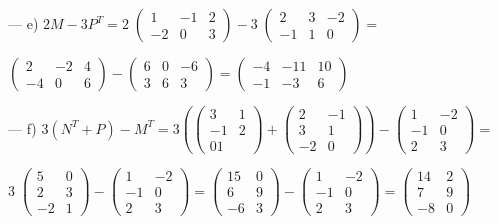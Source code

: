 \begin{proofw}
\noindent --- e) $2M-3P^T=2\; \left( \begin{matrix} 1&-1&2\\-2&0&3  \end{matrix} \right) - 3\; \left( \begin{matrix} 2&3&-2\\-1&1&0  \end{matrix} \right)=$

\noindent $\left( \begin{matrix} 2&-2&4\\-4&0&6   \end{matrix} \right) - \left( \begin{matrix} 6&0&-6\\3&6&3   \end{matrix} \right) = 
\left( \begin{matrix}  -4&-11&10\\-1&-3&6  \end{matrix} \right)$

\noindent --- f) $3(N^T+P)-M^T=3\left( 
\left( \begin{matrix}  3&1\\-1&2\\01  \end{matrix} \right)+
\left( \begin{matrix}  2&-1\\3&1\\-2&0  \end{matrix} \right)
  \right) - 
\left( \begin{matrix} 1&-2\\-1&0\\2&3   \end{matrix} \right) =$

\noindent $3\; \left( \begin{matrix}   5&0\\2&3\\-2&1 \end{matrix} \right)
- \left( \begin{matrix} 1&-2\\-1&0\\2&3   \end{matrix} \right)=
\left( \begin{matrix} 15&0\\6&9\\-6&3   \end{matrix} \right)-
\left( \begin{matrix} 1&-2\\-1&0\\2&3   \end{matrix} \right)=
\left( \begin{matrix} 14&2\\7&9\\-8&0   \end{matrix} \right)$


\end{proofw}
